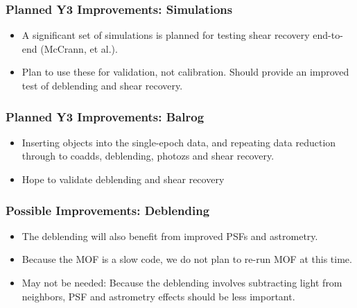 \documentclass{beamer}
\begin{document}
\frame
{
    \frametitle{Planned Y3 Improvements: Simulations}

    \begin{itemize}

        \item A significant set of simulations is planned
            for testing shear recovery end-to-end (McCrann, et al.).

        \item Plan to use these for validation, not calibration.  
            Should provide an improved test of deblending and
            shear recovery.

    \end{itemize}

}

\frame
{
    \frametitle{Planned Y3 Improvements: Balrog}

    \begin{itemize}

        \item Inserting objects into the single-epoch data, and
            repeating data reduction through to coadds, 
            deblending, photozs and shear recovery.

        \item Hope to validate deblending and shear recovery

    \end{itemize}

}


\frame
{
    \frametitle{Possible Improvements: Deblending}

    \begin{itemize}

        \item The deblending will also benefit from improved
            PSFs and astrometry.

        \item Because the MOF is a slow code, we do not plan
            to re-run MOF at this time.

        \item May not be needed: Because the deblending involves
            subtracting light from neighbors, PSF and astrometry
            effects should be less important.


    \end{itemize}

}
\end{document}
